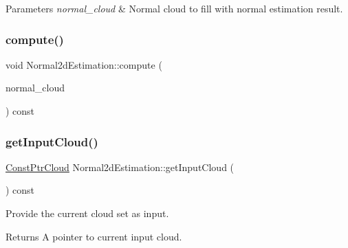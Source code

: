 \begin{DoxyParams}{Parameters}
{\em normal\+\_\+cloud} & Normal cloud to fill with normal estimation result. \\
\hline
\end{DoxyParams}
\mbox{\label{classNormal2dEstimation_ac3fd17679a20a7f4faab72f58fdc6199}} 
\subsubsection{\texorpdfstring{compute()}{compute()}\hspace{0.1cm}{\footnotesize\ttfamily [4/4]}}
{\footnotesize\ttfamily void Normal2d\+Estimation\+::compute (\begin{DoxyParamCaption}\item[{const \hyperlink{test0426_8cc_a6c737bbce051bc4690e4c608adc2deec}{pcl\+::\+Point\+Cloud}$<$ pcl\+::\+Normal $>$\+::Ptr \&}]{normal\+\_\+cloud }\end{DoxyParamCaption}) const\hspace{0.3cm}{\ttfamily [inline]}}

\mbox{\label{classNormal2dEstimation_a386f045fac5df50ed493d7b0aa265482}} 
\subsubsection{\texorpdfstring{get\+Input\+Cloud()}{getInputCloud()}\hspace{0.1cm}{\footnotesize\ttfamily [1/2]}}
{\footnotesize\ttfamily \hyperlink{Normal2dEstimation_8h_a389a43addc496dc19a5bb0575cc60bc4}{Const\+Ptr\+Cloud} Normal2d\+Estimation\+::get\+Input\+Cloud (\begin{DoxyParamCaption}{ }\end{DoxyParamCaption}) const\hspace{0.3cm}{\ttfamily [inline]}}



Provide the current cloud set as input. 

\begin{DoxyReturn}{Returns}
A pointer to current input cloud. 
\end{DoxyReturn}
\mbox{\label{classNormal2dEstimation_a386f045fac5df50ed493d7b0aa265482}} 
